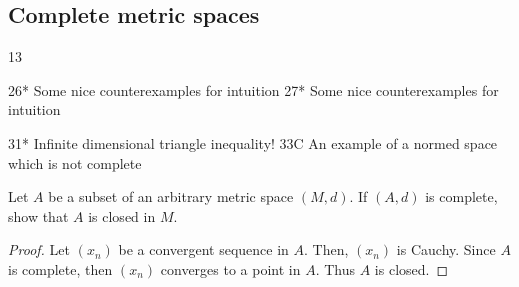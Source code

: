 \subsection{Complete metric spaces}

13

26* Some nice counterexamples for intuition
27* Some nice counterexamples for intuition 

31* Infinite dimensional triangle inequality!
33C An example of a normed space which is not complete

\begin{exercise}{12}
Let $A$ be a subset of an arbitrary metric space $(M,d)$.
If $(A,d)$ is complete, show that $A$ is closed in $M$.
\end{exercise}
\begin{proof}
Let $(x_n)$ be a convergent sequence in $A$.
Then, $(x_n)$ is Cauchy.
Since $A$ is complete, then $(x_n)$ converges to a point in $A$.
Thus $A$ is closed.
\end{proof} 

